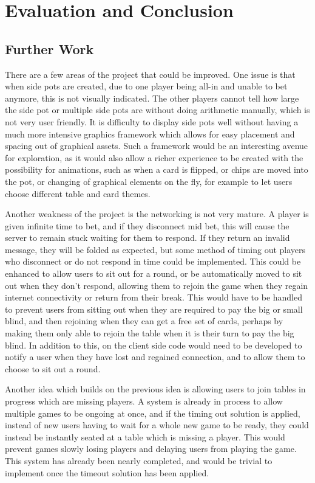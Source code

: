 \section{Evaluation and Conclusion}

\subsection{Further Work}
There are a few areas of the project that could be improved. One issue is that
when side pots are created, due to one player being all-in and unable to bet
anymore, this is not visually indicated. The other players cannot tell how
large the side pot or multiple side pots are without doing arithmetic manually,
which is not very user friendly. It is difficulty to display side pots well
without having a much more intensive graphics framework which allows for easy
placement and spacing out of graphical assets. Such a framework would be an
interesting avenue for exploration, as it would also allow a richer experience
to be created with the possibility for animations, such as when a card is
flipped, or chips are moved into the pot, or changing of graphical elements
on the fly, for example to let users choose different table and card themes.

Another weakness of the project is the networking is not very mature. A player
is given infinite time to bet, and if they disconnect mid bet, this will
cause the server to remain stuck waiting for them to respond. If they return
an invalid message, they will be folded as expected, but some method of timing
out players who disconnect or do not respond in time could be implemented.
This could be enhanced to allow users to sit out for a round, or be
automatically moved to sit out when they don't respond, allowing them to
rejoin the game when they regain internet connectivity or return from their
break. This would have to be handled to prevent users from sitting out when
they are required to pay the big or small blind, and then rejoining when they
can get a free set of cards, perhaps by making them only able to rejoin
the table when it is their turn to pay the big blind. In addition to this,
on the client side code would need to be developed to notify a user when they
have lost and regained connection, and to allow them to choose to sit out a 
round.

Another idea which builds on the previous idea is allowing users to join
tables in progress which are missing players. A system is already in process
to allow multiple games to be ongoing at once, and if the timing out solution
is applied, instead of new users having to wait for a whole new game to be
ready, they could instead be instantly seated at a table which is missing
a player. This would prevent games slowly losing players and delaying users
from playing the game. This system has already been nearly completed, and
would be trivial to implement once the timeout solution has been applied.

